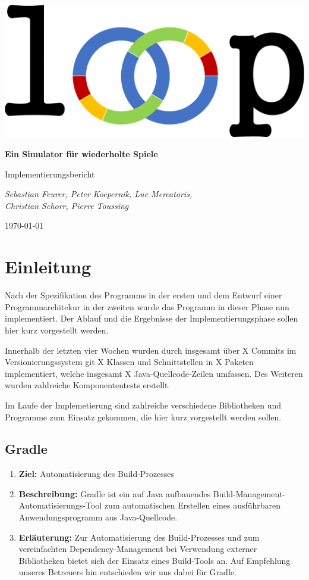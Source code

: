 \documentclass[parskip=full,11pt]{scrartcl}
\begin{document}
\begin{titlepage}
	\centering
	\vspace*{5cm}
	\includegraphics[width = 0.7\linewidth]{img/logo.png}\par
	{\huge\bfseries Ein Simulator für wiederholte Spiele\par}
	{\Large Implementierungsbericht\par}
	\vspace{2cm}
	{\Large\itshape Sebastian Feurer, Peter Koepernik, Luc Mercatoris,\\Christian Schorr, Pierre Toussing\par}
	\vfill
	{\large \today\par}
\end{titlepage}

\tableofcontents
\pagebreak

\section{Einleitung}
Nach der Spezifikation des Programms in der ersten und dem Entwurf einer Programmarchitekur in der zweiten wurde das Programm in dieser Phase nun implementiert. Der Ablauf und die Ergebnisse der Implementierungsphase sollen hier kurz vorgestellt werden.

Innerhalb der letzten vier Wochen wurden durch insgesamt über X Commits im Versionierungssystem git X Klassen und Schnittstellen in X Paketen implementiert, welche  insgesamt X Java-Quellcode-Zeilen umfassen. Des Weiteren wurden zahlreiche Komponententests erstellt.

Im Laufe der Implemetierung sind zahlreiche verschiedene Bibliotheken und Programme zum Einsatz gekommen, die hier kurz vorgestellt werden sollen.

\subsection{Gradle}
\begin{enumerate}
\item[] \textbf{Ziel:} Automatisierung des Build-Prozesses
\item[] \textbf{Beschreibung:} Gradle ist ein auf Java aufbauendes Build-Management-Automatisierungs-Tool zum automatischen Erstellen eines ausführbaren Anwendungsprogramm aus Java-Quellcode.
\item[] \textbf{Erläuterung:} Zur Automatisierung des Build-Prozesses und zum vereinfachten Dependency-Management bei Verwendung externer Bibliotheken bietet sich der Einsatz eines Build-Tools an. Auf Empfehlung unseres Betreuers hin entschieden wir uns dabei für Gradle.
\end{enumerate}
\end{document}
